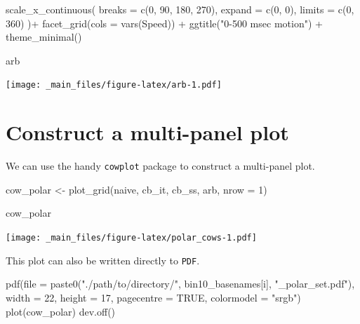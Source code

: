 \documentclass[
]{book}
\newenvironment{Shaded}{\begin{snugshade}}{\end{snugshade}}
\newcommand{\AttributeTok}[1]{\textcolor[rgb]{0.77,0.63,0.00}{#1}}
\newcommand{\ConstantTok}[1]{\textcolor[rgb]{0.00,0.00,0.00}{#1}}
\newcommand{\DecValTok}[1]{\textcolor[rgb]{0.00,0.00,0.81}{#1}}
\newcommand{\FunctionTok}[1]{\textcolor[rgb]{0.00,0.00,0.00}{#1}}
\newcommand{\NormalTok}[1]{#1}
\newcommand{\OtherTok}[1]{\textcolor[rgb]{0.56,0.35,0.01}{#1}}
\newcommand{\SpecialCharTok}[1]{\textcolor[rgb]{0.00,0.00,0.00}{#1}}
\newcommand{\StringTok}[1]{\textcolor[rgb]{0.31,0.60,0.02}{#1}}
\begin{document}
\begin{Shaded}
\begin{Highlighting}[]
  \FunctionTok{scale\_x\_continuous}\NormalTok{(}
    \AttributeTok{breaks =} \FunctionTok{c}\NormalTok{(}\DecValTok{0}\NormalTok{, }\DecValTok{90}\NormalTok{, }\DecValTok{180}\NormalTok{, }\DecValTok{270}\NormalTok{),}
    \AttributeTok{expand =} \FunctionTok{c}\NormalTok{(}\DecValTok{0}\NormalTok{, }\DecValTok{0}\NormalTok{),}
    \AttributeTok{limits =} \FunctionTok{c}\NormalTok{(}\DecValTok{0}\NormalTok{, }\DecValTok{360}\NormalTok{)}
\NormalTok{  )}\SpecialCharTok{+}
  \FunctionTok{facet\_grid}\NormalTok{(}\AttributeTok{cols =} \FunctionTok{vars}\NormalTok{(Speed)) }\SpecialCharTok{+}
  \FunctionTok{ggtitle}\NormalTok{(}\StringTok{"0{-}500 msec motion"}\NormalTok{) }\SpecialCharTok{+}
  \FunctionTok{theme\_minimal}\NormalTok{()}

\NormalTok{arb}
\end{Highlighting}
\end{Shaded}

\texttt{[image: \_main\_files/figure-latex/arb-1.pdf]}

\hypertarget{construct-a-multi-panel-plot}{%
\section{Construct a multi-panel plot}\label{construct-a-multi-panel-plot}}

We can use the handy \texttt{cowplot} package to construct a multi-panel plot.

\begin{Shaded}
\begin{Highlighting}[]
\NormalTok{cow\_polar }\OtherTok{\textless{}{-}}
  \FunctionTok{plot\_grid}\NormalTok{(naive, cb\_it, cb\_ss, arb,}
            \AttributeTok{nrow =} \DecValTok{1}\NormalTok{)}

\NormalTok{cow\_polar}
\end{Highlighting}
\end{Shaded}

\texttt{[image: \_main\_files/figure-latex/polar\_cows-1.pdf]}

This plot can also be written directly to \texttt{PDF}.

\begin{Shaded}
\begin{Highlighting}[]
\FunctionTok{pdf}\NormalTok{(}\AttributeTok{file =}
      \FunctionTok{paste0}\NormalTok{(}\StringTok{"./path/to/directory/"}\NormalTok{,}
\NormalTok{             bin10\_basenames[i],}
             \StringTok{"\_polar\_set.pdf"}\NormalTok{),}
    \AttributeTok{width =} \DecValTok{22}\NormalTok{, }\AttributeTok{height =} \DecValTok{17}\NormalTok{,}
    \AttributeTok{pagecentre =} \ConstantTok{TRUE}\NormalTok{, }\AttributeTok{colormodel =} \StringTok{"srgb"}\NormalTok{)}
\FunctionTok{plot}\NormalTok{(cow\_polar)}
\FunctionTok{dev.off}\NormalTok{()}
\end{Highlighting}
\end{Shaded}
\end{document}
